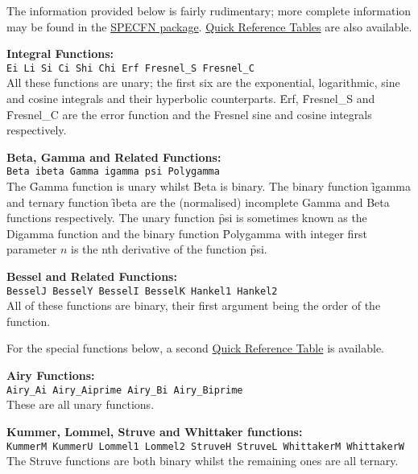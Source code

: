 The information provided below is fairly rudimentary; more complete
information may be found in the \hyperlink{SPECFNS}{SPECFN package}.
\hyperlink{SPECFNTAB1}{Quick Reference Tables} are also available.

 
\textbf{Integral Functions:}\\
\texttt{Ei Li Si Ci Shi Chi Erf Fresnel\_S Fresnel\_C }\\
All these functions are unary;
the first six are the exponential, logarithmic, sine and
cosine integrals and their hyperbolic counterparts. \f{Erf},
\f{Fresnel\_S} and \f{Fresnel\_C} are the error function and the Fresnel
sine and cosine integrals respectively.

\textbf{Beta, Gamma and Related Functions:}\\
\texttt{Beta ibeta Gamma igamma psi Polygamma}\\
The \f{Gamma} function is unary whilst \f{Beta} is binary.
The binary function \f{igamma} and ternary function \f{ibeta}
are the (normalised) incomplete Gamma and Beta functions respectively.
The unary function \f{psi} is sometimes known as the Digamma function and
the binary function \f{Polygamma} with integer first parameter $n$ is the
nth derivative of the function \f{psi}.

\textbf{Bessel and Related Functions:}\\
\texttt{BesselJ BesselY BesselI BesselK Hankel1 Hankel2}\\
 All of these functions are binary, their first argument being
the order of the function.

For the special functions below, a second
\hyperlink{SPECFNTAB2}{Quick Reference Table} is available.

\textbf{Airy Functions:}\\
\texttt{Airy\_Ai Airy\_Aiprime Airy\_Bi Airy\_Biprime}\\
These are all unary functions.

\textbf{Kummer, Lommel, Struve and Whittaker functions:}\\
\texttt{KummerM KummerU Lommel1 Lommel2 StruveH StruveL WhittakerM WhittakerW}\\
The Struve functions are both binary whilst the remaining ones are all ternary.

